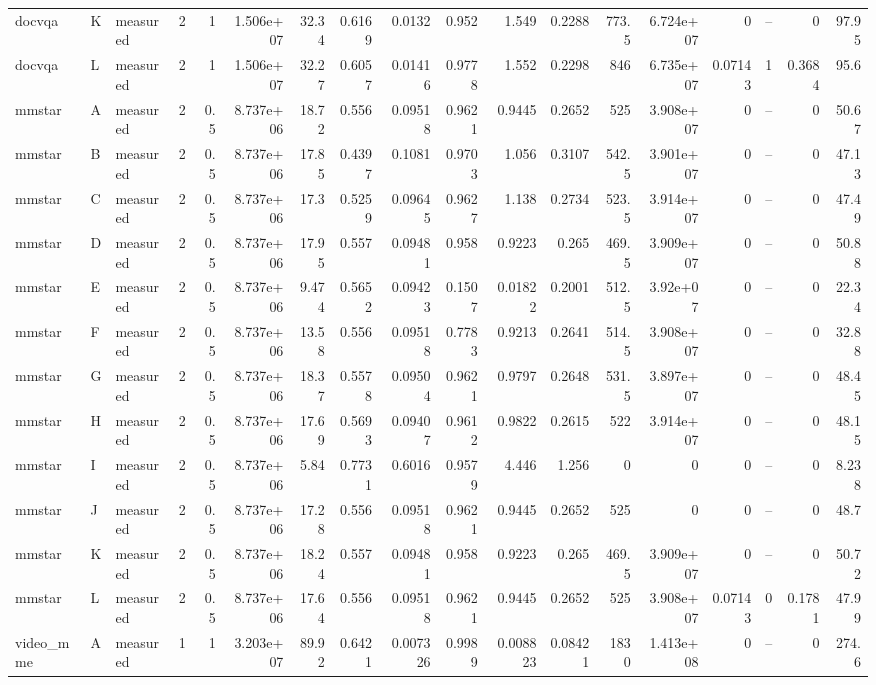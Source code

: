 \begin{longtable}{lllrrrrrrrrrrrrrrr}
docvqa & K & measured & 2 & 1 & 1.506e+07 & 32.34 & 0.6169 & 0.0132 & 0.952 & 1.549 & 0.2288 & 773.5 & 6.724e+07 & 0 & -- & 0 & 97.95 \\
docvqa & L & measured & 2 & 1 & 1.506e+07 & 32.27 & 0.6057 & 0.01416 & 0.9778 & 1.552 & 0.2298 & 846 & 6.735e+07 & 0.07143 & 1 & 0.3684 & 95.6 \\
mmstar & A & measured & 2 & 0.5 & 8.737e+06 & 18.72 & 0.556 & 0.09518 & 0.9621 & 0.9445 & 0.2652 & 525 & 3.908e+07 & 0 & -- & 0 & 50.67 \\
mmstar & B & measured & 2 & 0.5 & 8.737e+06 & 17.85 & 0.4397 & 0.1081 & 0.9703 & 1.056 & 0.3107 & 542.5 & 3.901e+07 & 0 & -- & 0 & 47.13 \\
mmstar & C & measured & 2 & 0.5 & 8.737e+06 & 17.3 & 0.5259 & 0.09645 & 0.9627 & 1.138 & 0.2734 & 523.5 & 3.914e+07 & 0 & -- & 0 & 47.49 \\
mmstar & D & measured & 2 & 0.5 & 8.737e+06 & 17.95 & 0.557 & 0.09481 & 0.958 & 0.9223 & 0.265 & 469.5 & 3.909e+07 & 0 & -- & 0 & 50.88 \\
mmstar & E & measured & 2 & 0.5 & 8.737e+06 & 9.474 & 0.5652 & 0.09423 & 0.1507 & 0.01822 & 0.2001 & 512.5 & 3.92e+07 & 0 & -- & 0 & 22.34 \\
mmstar & F & measured & 2 & 0.5 & 8.737e+06 & 13.58 & 0.556 & 0.09518 & 0.7783 & 0.9213 & 0.2641 & 514.5 & 3.908e+07 & 0 & -- & 0 & 32.88 \\
mmstar & G & measured & 2 & 0.5 & 8.737e+06 & 18.37 & 0.5578 & 0.09504 & 0.9621 & 0.9797 & 0.2648 & 531.5 & 3.897e+07 & 0 & -- & 0 & 48.45 \\
mmstar & H & measured & 2 & 0.5 & 8.737e+06 & 17.69 & 0.5693 & 0.09407 & 0.9612 & 0.9822 & 0.2615 & 522 & 3.914e+07 & 0 & -- & 0 & 48.15 \\
mmstar & I & measured & 2 & 0.5 & 8.737e+06 & 5.84 & 0.7731 & 0.6016 & 0.9579 & 4.446 & 1.256 & 0 & 0 & 0 & -- & 0 & 8.238 \\
mmstar & J & measured & 2 & 0.5 & 8.737e+06 & 17.28 & 0.556 & 0.09518 & 0.9621 & 0.9445 & 0.2652 & 525 & 0 & 0 & -- & 0 & 48.7 \\
mmstar & K & measured & 2 & 0.5 & 8.737e+06 & 18.24 & 0.557 & 0.09481 & 0.958 & 0.9223 & 0.265 & 469.5 & 3.909e+07 & 0 & -- & 0 & 50.72 \\
mmstar & L & measured & 2 & 0.5 & 8.737e+06 & 17.64 & 0.556 & 0.09518 & 0.9621 & 0.9445 & 0.2652 & 525 & 3.908e+07 & 0.07143 & 0 & 0.1781 & 47.99 \\
video\_mme & A & measured & 1 & 1 & 3.203e+07 & 89.92 & 0.6421 & 0.007326 & 0.9989 & 0.008823 & 0.08421 & 1830 & 1.413e+08 & 0 & -- & 0 & 274.6 \\

\end{longtable}
